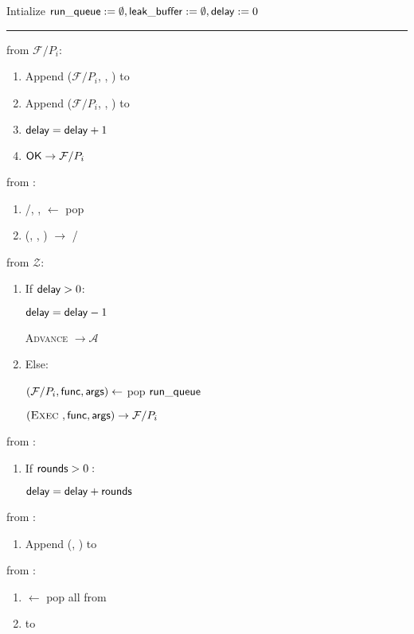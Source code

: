 \begin{bbox}[title={\textbf{Wrapper} $\Wasync$} ] 

Intialize ${\mathsf {run\_queue}} := \emptyset, {\mathsf {leak\_buffer}} := \emptyset, {\mathsf {delay}} := 0$

\vspace{2mm} \hrule \vspace{2mm}

\OnInput {} from $\mathcal{F}/P_i$:
	\begin{enumerate}
		\item Append ($\mathcal{F}/P_i$, , ) to 
		\item Append ($\mathcal{F}/P_i$, , ) to 
		\item ${\mathsf {delay}} = {\mathsf {delay}} + 1$
		\item \Send ${\mathsf {OK}} \rightarrow \mathcal{F}/P_i$
	\end{enumerate}


\OnInput {} from \Adversary:
	\begin{enumerate}
		\item \F/\Partyi, ,  $\leftarrow$ pop 
		\item \Send (\Exec, , ) $\rightarrow$ \F/\Partyi
	\end{enumerate}

\OnInput {} from $\mathcal{Z}$:
	\begin{enumerate}
		\item If ${\mathsf {delay}} > 0$:

			\quad  ${\mathsf {delay}} = {\mathsf {delay}} - 1$

			\quad  \Send \textsc{Advance} $\rightarrow \mathcal{A}$
		\item Else:
			
			\quad $(\mathcal{F}/P_i, {\mathsf {func}}, {\mathsf {args}}) \leftarrow$ pop ${\mathsf {run\_queue}}$

			\quad \Send $(\textsc{Exec}~, {\mathsf {func}}, {\mathsf {args}}) \rightarrow \mathcal{F}/P_i$
	\end{enumerate}

\OnInput {} from \Adversary:
	\begin{enumerate}
		\item If ${\mathsf {rounds}} > 0:$

			\quad ${\mathsf {delay}} = {\mathsf {delay}} + {\mathsf {rounds}}$
	\end{enumerate}

\OnInput {} from \F:
	\begin{enumerate}
		\item Append (\F, ) to 
	\end{enumerate}

\OnInput {} from \Adversary:
	\begin{enumerate}
		\item {} $\leftarrow$ pop all from 
		\item \Send {} to \Adversary
	\end{enumerate}
\end{bbox}
